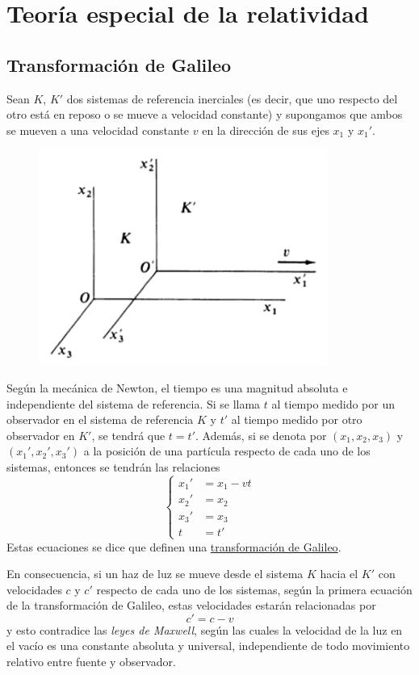 \documentclass[12pt]{report}
\begin{document}
\chapter{Teoría especial de la relatividad}

\section{Transformación de Galileo}

Sean $K$, $K'$ dos sistemas de referencia inerciales (es decir, que uno respecto del otro está en reposo o se mueve a velocidad constante) y supongamos que ambos se mueven a una velocidad constante $v$ en la dirección de sus ejes $x_1$ y $x_1'$.

\begin{figure}[h]
\includegraphics[scale = 0.75]{4.1_1}
\centering
\end{figure}

Según la mecánica de Newton, el tiempo es una magnitud absoluta e independiente del sistema de referencia. Si se llama $t$ al tiempo medido por un observador en el sistema de referencia $K$ y $t'$ al tiempo medido por otro observador en $K'$, se tendrá que $t = t'$. Además, si se denota por  $(x_1,x_2,x_3)$ y $(x_1', x_2',x_3')$ a la posición de una partícula respecto de cada uno de los sistemas, entonces se tendrán las relaciones
\[
\left\{
\begin{aligned}
    x_1' &=x_1-vt \\
    x_2' &=x_2 \\
    x_3' &=x_3 \\
    t    &=t'
\end{aligned}
\right.
\]
Estas ecuaciones se dice que definen una \ul{transformación de Galileo}.

\vspace{2mm}
En consecuencia, si un haz de luz se mueve desde el sistema $K$ hacia el $K'$ con velocidades $c$ y $c'$ respecto de cada uno de los sistemas, según la primera ecuación de la transformación de Galileo, estas velocidades estarán relacionadas por
\[c' = c - v\]
y esto contradice las \textit{leyes de Maxwell}, según las cuales la velocidad de la luz en el vacío es una constante absoluta y universal, independiente de todo movimiento relativo entre fuente y observador. 
\end{document}
